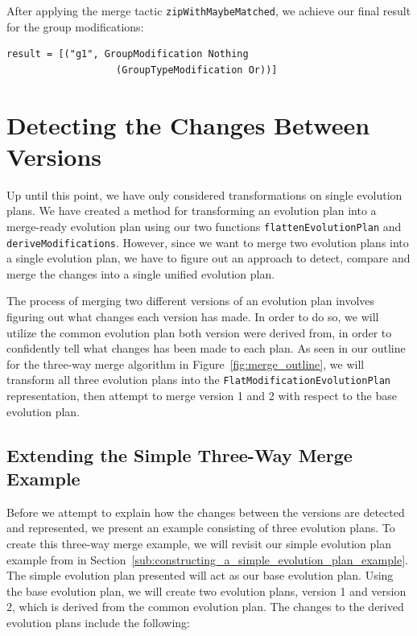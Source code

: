 \documentclass[a4paper,english]{ifimaster}
\begin{document}
After applying the merge tactic \texttt{zip\-With\-Maybe\-Matched}, we achieve our final result for the group modifications:

\begin{verbatim}
result = [("g1", GroupModification Nothing 
                   (GroupTypeModification Or))]
\end{verbatim}

\section{Detecting the Changes Between Versions}%
\label{sec:detecting_the_changes_between_versions}

Up until this point, we have only considered transformations on single evolution plans. We have created a method for transforming an evolution plan into a merge-ready evolution plan using our two functions \texttt{flatten\-Evolution\-Plan} and \texttt{derive\-Modifications}. However, since we want to merge two evolution plans into a single evolution plan, we have to figure out an approach to detect, compare and merge the changes into a single unified evolution plan.

The process of merging two different versions of an evolution plan involves figuring out what changes each version has made. In order to do so, we will utilize the common evolution plan both version were derived from, in order to confidently tell what changes has been made to each plan. As seen in our outline for the three-way merge algorithm in Figure~\vref{fig:merge_outline}, we will transform all three evolution plans into the \texttt{Flat\-Modification\-Evolution\-Plan} representation, then attempt to merge version 1 and 2 with respect to the base evolution plan.

\subsection{Extending the Simple Three-Way Merge Example}%
\label{sub:extending_the_simple_three_way_merge_example}

Before we attempt to explain how the changes between the versions are detected and represented, we present an example consisting of three evolution plans. To create this three-way merge example, we will revisit our simple evolution plan example from in Section~\vref{sub:constructing_a_simple_evolution_plan_example}. The simple evolution plan presented will act as our base evolution plan. Using the base evolution plan, we will create two evolution plans, version 1 and version 2, which is derived from the common evolution plan. The changes to the derived evolution plans include the following:
\end{document}
